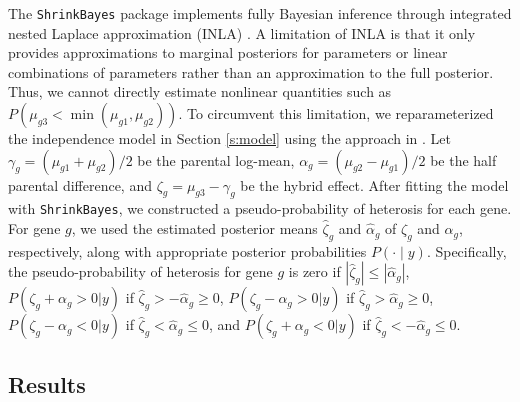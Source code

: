 \documentclass[useAMS,usenatbib,referee]{biom}
\begin{document}
The {\tt ShrinkBayes} package implements fully Bayesian inference through integrated nested Laplace approximation (INLA) \citep{rue2009approximate,van2014shrinkbayes}. A limitation of INLA is that it only provides approximations to marginal posteriors for parameters or linear combinations of parameters rather than an approximation to the full posterior. Thus, we cannot directly estimate nonlinear quantities such as $P(\mu_{g3} < \min(\mu_{g1},\mu_{g2}))$. To circumvent this limitation, we reparameterized the independence model in Section \ref{s:model} using the approach in \cite{ji2014estimation}. 
Let $\gamma_g = (\mu_{g1}+\mu_{g2})/2$ be the parental log-mean, $\alpha_g = (\mu_{g2}-\mu_{g1})/2$ be the half parental difference, and $\zeta_g = \mu_{g3} - \gamma_g$ be the hybrid effect. After fitting the model with {\tt ShrinkBayes}, we constructed a pseudo-probability of heterosis for each gene. For gene $g$, we used the estimated posterior means $\hat{\zeta}_g$ and $\hat{\alpha}_g$ of $\zeta_g$ and $\alpha_g$, respectively, along with appropriate posterior probabilities $P(\cdot \mid y)$. Specifically, the pseudo-probability of heterosis for gene $g$ is zero if $|\hat{\zeta}_g| \le |\hat{\alpha}_g|$, $P(\zeta_g + \alpha_g > 0 |y)$ if $\hat{\zeta}_g > -\hat{\alpha}_g \ge 0$, $P(\zeta_g - \alpha_g > 0 |y)$ if $\hat{\zeta}_g > \hat{\alpha}_g \ge 0$, $P(\zeta_g - \alpha_g < 0 |y)$ if $\hat{\zeta}_g < \hat{\alpha}_g \le 0$, and $P(\zeta_g + \alpha_g < 0 |y)$ if $\hat{\zeta}_g < -\hat{\alpha}_g \le 0$.  

\subsection{Results}
\end{document}
